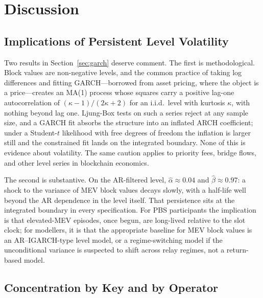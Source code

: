 \documentclass[11pt]{article}
\begin{document}
\section{Discussion}
\label{sec:discussion}

\subsection{Implications of Persistent Level Volatility}
\label{sec:disc_persistence}

Two results in Section~\ref{sec:garch} deserve comment. The first is
methodological. Block values are non-negative levels, and the common practice
of taking log differences and fitting GARCH---borrowed from asset pricing,
where the object is a price---creates an MA(1) process whose squares carry a
positive lag-one autocorrelation of $(\kappa-1)/(2\kappa+2)$ for an i.i.d.\ level with
kurtosis $\kappa$, with nothing beyond lag one. Ljung-Box tests on such a
series reject at any sample size, and a GARCH fit absorbs the structure into an
inflated ARCH coefficient; under a Student-$t$ likelihood with free degrees of
freedom the inflation is larger still and the constrained fit lands on the
integrated boundary. None of this is evidence about
volatility. The same caution applies to priority fees, bridge flows, and other
level series in blockchain economics.

The second is substantive. On the AR-filtered level, $\hat\alpha \approx 0.04$
and $\hat\beta \approx 0.97$: a shock to the variance of MEV block values decays
slowly, with a half-life well beyond the AR dependence in the level itself.
That persistence sits at the integrated boundary in every specification. For
PBS participants the implication is that elevated-MEV episodes, once begun,
are long-lived relative to the slot clock; for modellers, it is that the
appropriate baseline for MEV block values is an AR--IGARCH-type level model,
or a regime-switching model if the unconditional variance is suspected to
shift across relay regimes, not a return-based model.

\subsection{Concentration by Key and by Operator}
\label{sec:disc_concentration}
\end{document}
